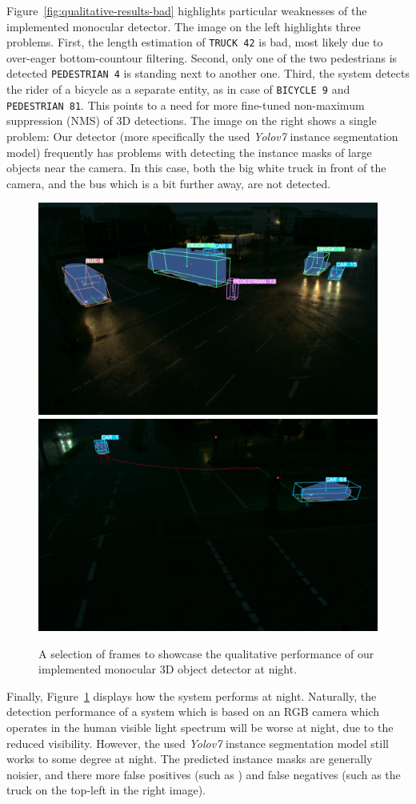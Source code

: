 Figure~\ref{fig:qualitative-results-bad} highlights particular weaknesses of the implemented monocular detector.
The image on the left highlights three problems.
First, the length estimation of \texttt{TRUCK 42} is bad, most likely due to over-eager bottom-countour filtering.
Second, only one of the two pedestrians is detected \textemdash \texttt{PEDESTRIAN 4} is standing next to another one.
Third, the system detects the rider of a bicycle as a separate entity, as in case of \texttt{BICYCLE 9} and \texttt{PEDESTRIAN 81}.
This points to a need for more fine-tuned non-maximum suppression (NMS) of 3D detections.
The image on the right shows a single problem: Our detector (more specifically the used \textit{Yolov7} instance segmentation model) frequently has problems with detecting the instance masks of large objects near the camera.
In this case, both the big white truck in front of the camera, and the bus which is a bit further away, are not detected.

\begin{figure}[htb]
    \includegraphics[width=0.499\linewidth]{
        figures/selection/1653330059.588901912.s110.camera.basler.south2.8mm}
    \includegraphics[width=0.499\linewidth]{
        figures/selection/1653330064.207615030.s110.camera.basler.south1.8mm}
    \caption{A selection of frames to showcase the qualitative performance of our implemented monocular 3D object detector at night.}
    \label{fig:qualitative-results-night}
\end{figure}

Finally, Figure~\ref{fig:qualitative-results-night} displays how the system performs at night.
Naturally, the detection performance of a system which is based on an RGB camera which operates in the human visible light spectrum will be worse at night, due to the reduced visibility.
However, the used \textit{Yolov7} instance segmentation model still works to some degree at night.
The predicted instance masks are generally noisier, and there more false positives (such as ) and false negatives (such as the truck on the top-left in the right image).

